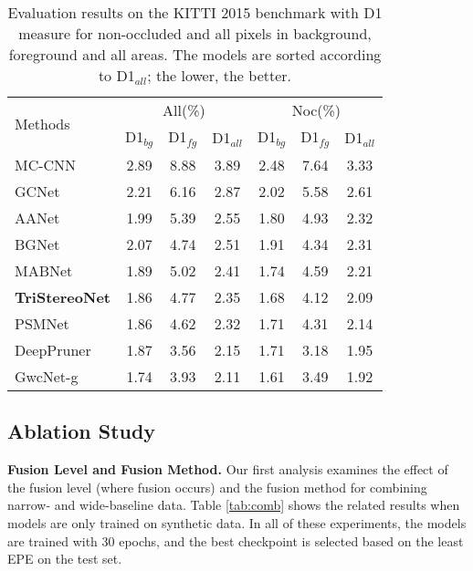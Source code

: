 \documentclass[10pt,twocolumn,letterpaper]{article}
\begin{document}
\begin{table}[tbp]
	\begin{center}
		\footnotesize
		\begin{tabular}{@{\hskip5pt}l@{\hskip5pt}|@{\hskip5pt}c@{\hskip5pt}c@{\hskip5pt}c@{\hskip5pt}|@{\hskip5pt}c@{\hskip5pt}c@{\hskip5pt}c@{\hskip5pt}}
			\hline
			\multirow{2}{*}{Methods} & \multicolumn{3}{c|}{All(\%)} & \multicolumn{3}{c}{Noc(\%)}  \\	 \cline{2-7} 
			& {D1$_{bg}$} & {D1$_{fg}$} & {D1$_{all}$} & {D1$_{bg}$} & {D1$_{fg}$} & {D1$_{all}$}  \\ \hline
			MC-CNN\cite{zbontar2016stereo} & 2.89 & 8.88 &3.89 & 2.48 & 7.64& 3.33\\
			GCNet\cite{kendall2017end} & 2.21 & 6.16 & 2.87 & 2.02 & 5.58 & 2.61 \\
			AANet \cite{xu2020aanet} & 1.99 & 5.39 & 2.55 & 1.80 & 4.93 & 2.32 \\
			BGNet\cite{xu2021bilateral} & 2.07 & 4.74 & 2.51 & 1.91 & 4.34 & 2.31 \\ 
			MABNet\cite{xing2020mabnet} & 1.89 & 5.02	 & 2.41 & 1.74 & 4.59	 & 2.21	\\ \hdashline	
			\textbf{TriStereoNet} &  1.86 & 4.77 & 2.35 &  1.68 & 4.12 & 2.09  \\\hdashline
			PSMNet\cite{chang2018pyramid} & 1.86 & 4.62 & 2.32 & 1.71 & 4.31 & 2.14 \\
			DeepPruner \cite{duggal2019deeppruner} & 1.87 & 3.56 & 2.15 & 1.71 & 3.18 & 1.95 \\
			GwcNet-g\cite{guo2019group} & 1.74 & 3.93 & 2.11 & 1.61 & 3.49 & 1.92 \\ \hline
		\end{tabular}
	\end{center}
	\vspace*{-0.6cm}
	\caption{Evaluation results on the KITTI 2015 benchmark with D1 measure for non-occluded and all pixels in background, foreground and all areas. The models are sorted according to D1$_{all}$; the lower, the better.}
	\label{tab:kitti}
\end{table}	 \subsection{Ablation Study}
\noindent\textbf{Fusion Level and Fusion Method.} Our first analysis examines the effect of the fusion level (where fusion occurs) and the fusion method for combining narrow- and wide-baseline data. Table \ref{tab:comb} shows the related results when models are only trained on synthetic data. In all of these experiments, the models are trained with 30 epochs, and the best checkpoint is selected based on the least EPE on the test set.
\end{document}

